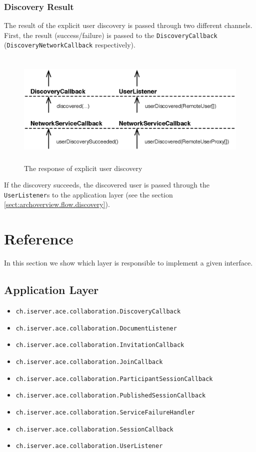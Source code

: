\subsubsection{Discovery Result}
The result of the explicit user discovery is passed through two different
channels. First, the result (success/failure) is passed to the
\texttt{Discovery\-Callback} (\texttt{Discovery\-Network\-Callback}
respectively).

\begin{figure}[H]
 \centering
 \includegraphics[width=14.53cm,height=5.50cm]{../images/finalreport/architecture_flows/explicitdiscovery_response.eps}
 \caption{The response of explicit user discovery}
 \label{fig:archoverview.flow.explicitdiscoveryresponse}
\end{figure}

If the discovery succeeds, the discovered user is passed through the
\texttt{User\-Listener}s to the application layer (see the section
\ref{sect:archoverview.flow.discovery}).



\section{Reference}
In this section we show which layer is responsible to implement a given
interface.

\subsection{Application Layer}
\begin{itemize}
 \item \texttt{ch.iserver.ace.collaboration.DiscoveryCallback}
 \item \texttt{ch.iserver.ace.collaboration.DocumentListener}
 \item \texttt{ch.iserver.ace.collaboration.InvitationCallback}
 \item \texttt{ch.iserver.ace.collaboration.JoinCallback}
 \item \texttt{ch.iserver.ace.collaboration.ParticipantSessionCallback}
 \item \texttt{ch.iserver.ace.collaboration.PublishedSessionCallback}
 \item \texttt{ch.iserver.ace.collaboration.ServiceFailureHandler}
 \item \texttt{ch.iserver.ace.collaboration.SessionCallback}
 \item \texttt{ch.iserver.ace.collaboration.UserListener}
\end{itemize}

